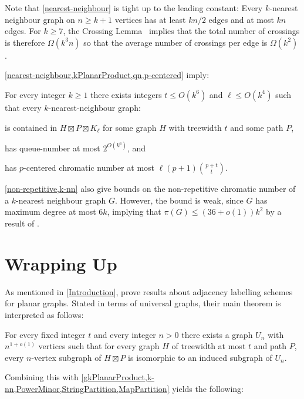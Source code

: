 \documentclass{patmorin}
\renewcommand{\ge}{\geqslant}
\renewcommand{\geq}{\geqslant}
\renewcommand{\leq}{\leqslant}
\begin{document}
Note that \cref{nearest-neighbour} is tight up to the leading constant:  Every $k$-nearest neighbour graph on $n\ge k+1$ vertices has at least $kn/2$ edges and at most $kn$ edges.  For $k\ge 7$, the Crossing Lemma~\citep{ajtai.chvatal.ea:crossing-free,leighton:complexity} implies that the total number of crossings is therefore $\Omega(k^3n)$ so that the average number of crossings per edge is $\Omega(k^2)$.

\cref{nearest-neighbour,kPlanarProduct,qn,p-centered} imply:

\begin{cor}
\label{k-nn}
For every integer $k\geq 1$ there exists integers $t\leq O(k^6)$ and $\ell\leq O(k^4)$ such that every $k$-nearest-neighbour graph:
\begin{compactitem}
\item is contained in $H\boxtimes P \boxtimes K_\ell$ for some graph $H$ with treewidth $t$ and some path $P$,
\item has queue-number at most $2^{O(k^6)}$, and
\item has $p$-centered chromatic number at most $\ell (p+1)\binom{p+t}{t}$.
\end{compactitem}
\end{cor}

\cref{non-repetitive,k-nn} also give bounds on the non-repetitive chromatic number of a $k$-nearest neighbour graph $G$. However, the bound is weak, since $G$ has maximum degree at most $6k$, implying that $\pi(G) \leq (36+o(1))k^2$ by a result of \citet{DJKW16}.

\section{Wrapping Up}
\label{WrappingUp}

As mentioned in \cref{Introduction}, \citet{DEJGMM21} prove results about adjacency labelling schemes for planar graphs. Stated in terms of universal graphs, their main theorem is interpreted as follows:

\begin{thm}
	\label{Universal}
	For every fixed integer $t$ and every integer $n>0$ there exists a
	graph $U_n$ with $n^{1+o(1)}$ vertices such that for every graph $H$ of
	treewidth at most $t$ and path $P$, every $n$-vertex subgraph of $H\boxtimes P$ is isomorphic to an induced subgraph of $U_n$.
\end{thm}

Combining this with \cref{gkPlanarProduct,k-nn,PowerMinor,StringPartition,MapPartition} yields the following:
\end{document}
